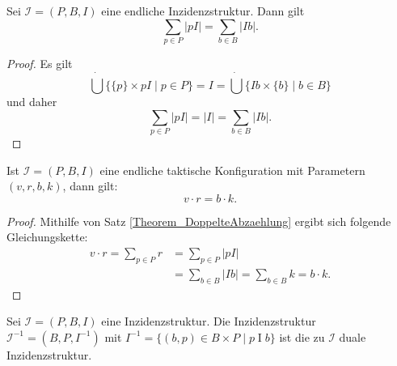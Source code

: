 \documentclass{article}
\begin{document}
\begin{theorem}\label{Theorem_DoppelteAbzaehlung}
  Sei $\mathcal{I} = (P, B, I)$ eine endliche Inzidenzstruktur.
  Dann gilt
  \begin{equation*}
    \sum_{p \in P} |pI| = \sum_{b \in B} |Ib|.
  \end{equation*}
\end{theorem}
\begin{proof}
  Es gilt
  \begin{equation*}
    \dot{\bigcup} \{\{p\} \times pI \mid p \in P\} = I = \dot{\bigcup} \{ Ib \times \{b\} \mid b \in B\}
  \end{equation*}
  und daher
  \begin{equation*}
    \sum_{p \in P} |pI| = |I| = \sum_{b \in B} |Ib|.
  \end{equation*}
\end{proof}

\begin{theorem}
  Ist $\mathcal{I} = (P, B, I)$ eine endliche taktische Konfiguration mit Parametern $(v, r, b, k)$,
  dann gilt:
  \begin{equation*}
    v \cdot r = b \cdot k.
  \end{equation*}
\end{theorem}
\begin{proof}
  Mithilfe von Satz \ref{Theorem_DoppelteAbzaehlung} ergibt sich folgende Gleichungskette:
  \begin{align*}
    v \cdot r = \sum_{p \in P} r &= \sum_{p \in P} |pI| \\
    &= \sum_{b \in B} |Ib| = \sum_{b \in B} k = b \cdot k.
  \end{align*}
\end{proof}

\begin{definition}
  Sei $\mathcal{I} = (P, B, I)$ eine Inzidenzstruktur.
  Die Inzidenzstruktur ${\mathcal{I}^{-1} = (B, P, I^{-1})}$
  mit ${I^{-1} = \{(b, p) \in {B \times P} \mid p \mathrel{I} b\}}$
  ist die zu $\mathcal{I}$ duale Inzidenzstruktur.
\end{definition}
\end{document}
